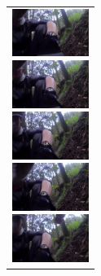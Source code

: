 \begin{figure}[htbp]
\begin{tabular}{l}
      \begin{minipage}{0.165\hsize}
        \begin{center}
          \includegraphics[clip, width=2.5cm]{./Figures/still_seevictim1.eps}
        \end{center}
      \end{minipage}
      \begin{minipage}{0.165\hsize}
        \begin{center}
          \includegraphics[clip, width=2.5cm]{./Figures/still_seevictim2.eps}
        \end{center}
      \end{minipage}
      \begin{minipage}{0.165\hsize}
        \begin{center}
          \includegraphics[clip, width=2.5cm]{./Figures/still_seevictim3.eps}
        \end{center}
      \end{minipage}
      \begin{minipage}{0.165\hsize}
        \begin{center}
          \includegraphics[clip, width=2.5cm]{./Figures/still_seevictim4.eps}
        \end{center}
      \end{minipage}
      \begin{minipage}{0.165\hsize}
        \begin{center}
          \includegraphics[clip, width=2.5cm]{./Figures/still_seevictim5.eps}

\end{center}
\end{minipage}
\end{tabular}
\end{figure}
